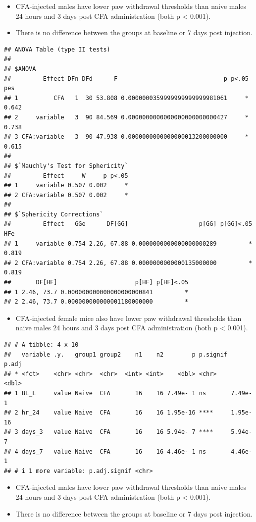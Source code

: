 \documentclass[
]{book}
\providecommand{\tightlist}{%
  \setlength{\itemsep}{0pt}\setlength{\parskip}{0pt}}
\begin{document}
\begin{itemize}
\item
  CFA-injected males have lower paw withdrawal thresholds than naive males 24 hours and 3 days post CFA administration (both p \textless{} 0.001).
\item
  There is no difference between the groups at baseline or 7 days post injection.
\end{itemize}

\begin{verbatim}
## ANOVA Table (type II tests)
## 
## $ANOVA
##         Effect DFn DFd      F                              p p<.05   pes
## 1          CFA   1  30 53.808 0.0000000359999999999999981061     * 0.642
## 2     variable   3  90 84.569 0.0000000000000000000000000427     * 0.738
## 3 CFA:variable   3  90 47.938 0.0000000000000000013200000000     * 0.615
## 
## $`Mauchly's Test for Sphericity`
##         Effect     W     p p<.05
## 1     variable 0.507 0.002     *
## 2 CFA:variable 0.507 0.002     *
## 
## $`Sphericity Corrections`
##         Effect   GGe      DF[GG]                    p[GG] p[GG]<.05   HFe
## 1     variable 0.754 2.26, 67.88 0.0000000000000000000289         * 0.819
## 2 CFA:variable 0.754 2.26, 67.88 0.0000000000000135000000         * 0.819
##       DF[HF]                      p[HF] p[HF]<.05
## 1 2.46, 73.7 0.000000000000000000000841         *
## 2 2.46, 73.7 0.000000000000001180000000         *
\end{verbatim}

\begin{itemize}
\tightlist
\item
  CFA-injected female mice also have lower paw withdrawal thresholds than naive males 24 hours and 3 days post CFA administration (both p \textless{} 0.001).
\end{itemize}

\begin{verbatim}
## # A tibble: 4 x 10
##   variable .y.   group1 group2    n1    n2        p p.signif    p.adj
## * <fct>    <chr> <chr>  <chr>  <int> <int>    <dbl> <chr>       <dbl>
## 1 BL_L     value Naive  CFA       16    16 7.49e- 1 ns       7.49e- 1
## 2 hr_24    value Naive  CFA       16    16 1.95e-16 ****     1.95e-16
## 3 days_3   value Naive  CFA       16    16 5.94e- 7 ****     5.94e- 7
## 4 days_7   value Naive  CFA       16    16 4.46e- 1 ns       4.46e- 1
## # i 1 more variable: p.adj.signif <chr>
\end{verbatim}

\begin{itemize}
\item
  CFA-injected males have lower paw withdrawal thresholds than naive males 24 hours and 3 days post CFA administration (both p \textless{} 0.001).
\item
  There is no difference between the groups at baseline or 7 days post injection.
\end{itemize}
\end{document}
